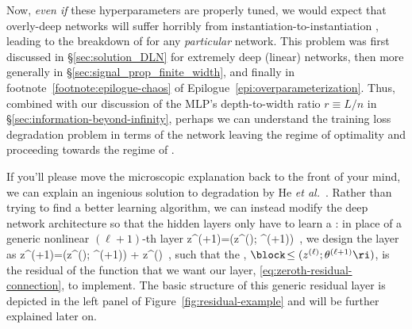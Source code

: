 Now, \emph{even if} these hyperparameters are  properly tuned, we would expect that overly-deep networks 
will suffer horribly from instantiation-to-instantiation , leading to the breakdown of  for any \emph{particular} network. This problem was first discussed in \S\ref{sec:solution_DLN} for extremely deep (linear) networks, then more generally  in \S\ref{sec:signal_prop_finite_width}, and finally in footnote~\ref{footnote:epilogue-chaos} of Epilogue~\ref{epi:overparameterization}. Thus, combined with our discussion  
of the MLP's depth-to-width ratio $r\equiv L/n$ in 
\S\ref{sec:information-beyond-infinity},
perhaps we %
can understand the training loss degradation problem in terms of the network leaving the regime of optimality and proceeding towards the regime of .


If you'll please move the microscopic explanation back to the front of your mind, we can explain an ingenious solution to 
degradation
by He \emph{et al.}~\cite{he2016deep}.
Rather than trying to find a better learning algorithm, we can instead modify the deep network architecture so that the hidden layers 
only have to learn a : in place of a generic nonlinear $(\ell+1)$-th layer
\be\label{eq:zeroth-residual-connection}
z^{(\ell+1)}=\layer\!\le(z^{(\ell)}; \theta^{(\ell+1)}\ri)\, ,
\ee
we design the layer as
\be\label{eq:first-residual-connection}
z^{(\ell+1)}=\block\!\le(z^{(\ell)}; \theta^{(\ell+1)}\ri) + z^{(\ell)}\, ,
\ee
such that the , $\block\!\le(z^{(\ell)}; \theta^{(\ell+1)}\ri)$,
is the residual of the function
that we want our layer, \eqref{eq:zeroth-residual-connection}, to implement.
The basic structure of this generic residual layer is depicted in the left panel of Figure~\ref{fig:residual-example} and will be further explained later on.


